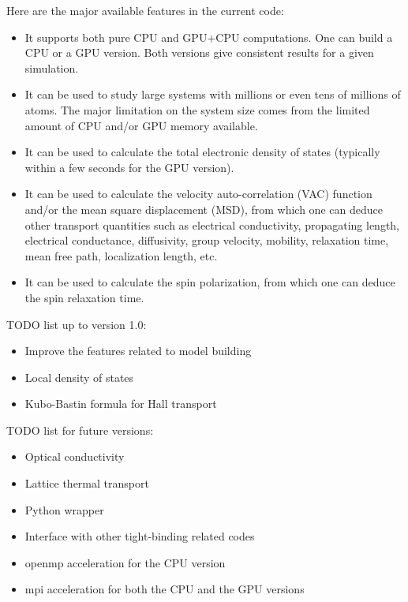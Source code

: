 \documentclass[12pt,a4paper]{report}
\begin{document}
Here are the major available features in the current code:
\begin{itemize}
\item It supports both pure CPU and GPU+CPU computations. One can build a CPU or a GPU version. Both versions give consistent results for a given simulation.
\item It can be used to study large systems with millions or even tens of millions of atoms. The major limitation on the system size comes from the limited amount of CPU and/or GPU memory available.
\item It can be used to calculate the total electronic density of states (typically within a few seconds for the GPU version).
\item It can be used to calculate the velocity auto-correlation (VAC) function and/or the mean square displacement (MSD), from which one can deduce other transport quantities such as electrical conductivity, propagating length, electrical conductance, diffusivity, group velocity, mobility, relaxation time, mean free path, localization length, etc.
\item It can be used to calculate the spin polarization, from which one can deduce the spin relaxation time.
\end{itemize}

TODO list up to version 1.0:
\begin{itemize}
\item Improve the features related to model building
\item Local density of states
\item Kubo-Bastin formula for Hall transport
\end{itemize}


TODO list for future versions:
\begin{itemize}
\item Optical conductivity
\item Lattice thermal transport
\item Python wrapper
\item Interface with other tight-binding related codes
\item openmp acceleration for the CPU version
\item mpi acceleration for both the CPU and the GPU versions
\end{itemize}
\end{document}
